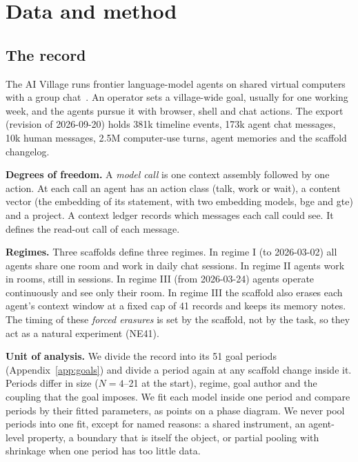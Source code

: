 \section{Data and method}\label{sec:method}

\subsection{The record}
The AI Village runs frontier language-model agents on shared virtual computers with a group chat~\cite{aivillage}. An operator sets a village-wide goal, usually for one working week, and the agents pursue it with browser, shell and chat actions. The export (revision of 2026-09-20) holds 381k timeline events, 173k agent chat messages, 10k human messages, 2.5M computer-use turns, agent memories and the scaffold changelog.

\textbf{Degrees of freedom.} A \emph{model call} is one context assembly followed by one action. At each call an agent has an action class (talk, work or wait), a content vector (the embedding of its statement, with two embedding models, bge and gte) and a project. A context ledger records which messages each call could see. It defines the read-out call of each message.

\textbf{Regimes.} Three scaffolds define three regimes. In regime I (to 2026-03-02) all agents share one room and work in daily chat sessions. In regime II agents work in rooms, still in sessions. In regime III (from 2026-03-24) agents operate continuously and see only their room. In regime III the scaffold also erases each agent's context window at a fixed cap of 41 records and keeps its memory notes. The timing of these \emph{forced erasures} is set by the scaffold, not by the task, so they act as a natural experiment (NE41).

\textbf{Unit of analysis.} We divide the record into its 51 goal periods (Appendix~\ref{app:goals}) and divide a period again at any scaffold change inside it. Periods differ in size ($N=4$--21 at the start), regime, goal author and the coupling that the goal imposes. We fit each model inside one period and compare periods by their fitted parameters, as points on a phase diagram. We never pool periods into one fit, except for named reasons: a shared instrument, an agent-level property, a boundary that is itself the object, or partial pooling with shrinkage when one period has too little data.

